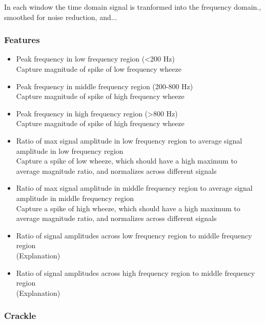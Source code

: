 \documentclass{article}
\begin{document}
In each window the time domain signal is tranformed into the frequency domain., smoothed for noise reduction, and...\\

\subsubsection{Features}

\begin{itemize}
\item
	Peak frequency in low frequency region (<200 Hz)\\
	Capture magnitude of spike of low frequency wheeze\\
\item
	Peak frequency in middle frequency region (200-800 Hz)\\
	Capture magnitude of spike of high frequency wheeze\\
\item
	Peak frequency in high frequency region (>800 Hz)\\
	Capture magnitude of spike of high frequency wheeze\\
\item
	Ratio of max signal amplitude in low frequency region to average signal amplitude in low frequency region\\
	Capture a spike of low wheeze, which should have a high maximum to average magnitude ratio, and normalizes across different signals\\
\item
	Ratio of max signal amplitude in middle frequency region to average signal amplitude in middle frequency region\\
	Capture a spike of high wheeze, which should have a high maximum to average magnitude ratio, and normalizes across different signals\\
\item
	Ratio of signal amplitudes across low frequency region to middle frequency region\\
	(Explanation)\\
\item
	Ratio of signal amplitudes across high frequency region to middle frequency region\\
	(Explanation)\\
\end{itemize}

\subsubsection{Crackle}
\end{document}
